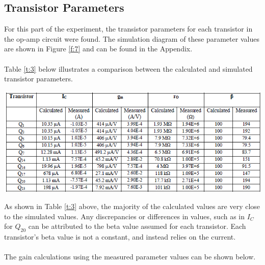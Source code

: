 \documentclass{article}
\begin{document}
	\subsection{Transistor Parameters}
	For this part of the experiment, the transistor parameters for each transistor in the op-amp circuit were found.
	The simulation diagram of these parameter values are shown in Figure \ref{f:7} and can be found in the Appendix.\\\\
	Table \ref{t:3} below illustrates a comparison between the calculated and simulated transistor parameters.
	\begin{table}[!ht]
		\centering
		\includegraphics[width=0.7\textheight]{c_vs_s.png}
		\label{t:3}
	\end{table}
	As shown in Table \ref{t:3} above, the majority of the calculated values are very close to the simulated values.
	Any discrepancies or differences in values, such as in $I_C$ for $Q_{20}$ can be attributed to the beta value assumed for each transistor.
	Each transistor’s beta value is not a constant, and instead relies on the current.\\\\
	The gain calculations using the measured parameter values can be shown below.
\end{document}

